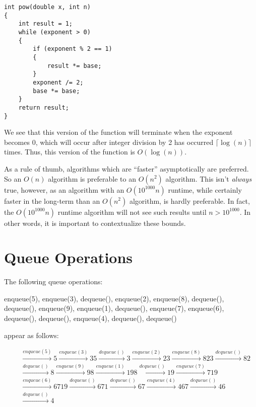\documentclass[a4paper]{article}
\begin{document}
\begin{itemize}
\begin{verbatim}
int pow(double x, int n)
{
	int result = 1;
	while (exponent > 0)
	{
		if (exponent % 2 == 1)
		{
			result *= base;
		}
		exponent /= 2;
		base *= base;
	}
	return result;
}
\end{verbatim}

We see that this version of the function will terminate when the exponent becomes 0, which will occur after integer division by 2 has occurred $\lceil\log(n)\rceil$ times. Thus, this version of the function is $O(\log(n))$.

As a rule of thumb, algorithms which are ``faster'' asymptotically are preferred. So an $O(n)$ algorithm is preferable to an $O(n^2)$ algorithm. This isn't \textit{always} true, however, as an algorithm with an $O(10^{1000}n)$ runtime, while certainly faster in the long-term than an $O(n^2)$ algorithm, is hardly preferable. In fact, the $O(10^{1000}n)$ runtime algorithm will not see such results until $n>10^{1000}$. In other words, it is important to contextualize these bounds.
\end{itemize}

\section{Queue Operations}
The following queue operations:

enqueue(5), enqueue(3), dequeue(), enqueue(2), enqueue(8), dequeue(), dequeue(), enqueue(9), enqueue(1), dequeue(), enqueue(7), enqueue(6), dequeue(), dequeue(), enqueue(4), dequeue(), dequeue()

appear as follows:

\begin{align*}
\boxed{\phantom{5}}&\xrightarrow{enqueue(5)}\boxed{5}\xrightarrow{enqueue(3)}\boxed{3}\boxed{5}\xrightarrow{dequeue()}\boxed{3}\xrightarrow{enqueue(2)}\boxed{2}\boxed{3}\xrightarrow{enqueue(8)}\boxed{8}\boxed{2}\boxed{3}\xrightarrow{dequeue()}\boxed{8}\boxed{2}\\&\xrightarrow{dequeue()}\boxed{8}\xrightarrow{enqueue(9)}\boxed{9}\boxed{8}\xrightarrow{enqueue(1)}\boxed{1}\boxed{9}\boxed{8}\xrightarrow{dequeue()}\boxed{1}\boxed{9}\xrightarrow{enqueue(7)}\boxed{7}\boxed{1}\boxed{9}\\&\xrightarrow{enqueue(6)}\boxed{6}\boxed{7}\boxed{1}\boxed{9}\xrightarrow{dequeue()}\boxed{6}\boxed{7}\boxed{1}\xrightarrow{dequeue()}\boxed{6}\boxed{7}\xrightarrow{enqueue(4)}\boxed{4}\boxed{6}\boxed{7}\xrightarrow{dequeue()}\boxed{4}\boxed{6}\\&\xrightarrow{dequeue()}\boxed{4}
\end{align*}
\end{document}
